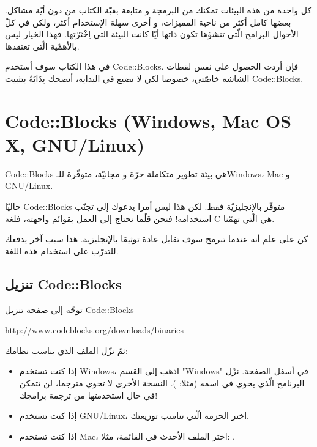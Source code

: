كل واحدة من هذه البيئات تمكنك من البرمجة و متابعة بقيّة الكتاب من دون أيّة مشاكل. بعضها كامل أكثر من ناحية المميزات، و أخرى سهلة الإستخدام أكثر، ولكن في كلّ الأحوال البرامج الّتي تنشؤها تكون ذاتها أيّا كانت البيئة التي اِخْتَرْتها. فهذا الخيار ليس بالأهمّية الّتي تعتقدها.

في هذا الكتاب سوف أستخدم
\textenglish{Code::Blocks}.
فإن أردت الحصول على نفس لقطات الشاشة خاصّتي، خصوصا لكي لا تضيع في البداية، أنصحك بِدَايَةً بتثبيت
\textenglish{Code::Blocks}.

\section{\textenglish{Code::Blocks} (\textenglish{Windows, Mac OS X, GNU/Linux})}

\textenglish{Code::Blocks}
هي بيئة تطوير متكاملة حرّة و مجانيّة، متوفّرة للـ\textenglish{Windows}،
\textenglish{Mac}
و
\textenglish{GNU/Linux}.

حاليّا
\textenglish{Code::Blocks}
متوفّر بالإنجليزيّة فقط. لكن هذا ليس أمرا يدعوك إلى تجنّب استخدامه! فنحن قلّما نحتاج إلى العمل بقوائم واجهته، فلغة
\textenglish{C}
هي الّتي تهمّنا.

كن على علم أنه عندما تبرمج سوف تقابل عادة توثيقا بالإنجليزية. هذا سبب آخر يدفعك للتدرّب على استخدام هذه اللغة.

\subsection{تنزيل \textenglish{Code::Blocks}}

توجّه إلى صفحة تنزيل
\textenglish{Code::Blocks}

\url{http://www.codeblocks.org/downloads/binaries}

ثمّ نزّل الملف الذي يناسب نظامك:

\begin{itemize}
  \item إذا كنت تستخدم
\textenglish{Windows}،
اذهب إلى القسم
"\textenglish{Windows}"
في أسفل الصفحة. نزّل البرنامج الّذي يحوي
في اسمه (مثلا:
).
النسخة الأخرى لا تحوي مترجما، لن تتمكن في حال استخدمتها من ترجمة برامجك!
  \item إذا كنت تستخدم
\textenglish{GNU/Linux}،
اختر الحزمة الّتي تناسب توزيعتك.

  \item إذا كنت تستخدم
\textenglish{Mac}،
اختر الملف الأحدث في القائمة، مثلا:
.

\end{itemize}

